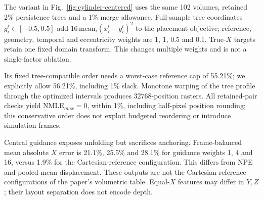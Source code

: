\documentclass[10pt]{article}
\begin{document}
The variant in Fig.~\ref{fig:cylinder-centered} uses the same 102 volumes, retained 2\% persistence trees and a 1\% merge allowance. Full-sample tree coordinates $g_i^t\in[-0.5,0.5]$ add $16\,\mathrm{mean}_i(x_i^t-g_i^t)^2$ to the placement objective; reference, geometry, temporal and eccentricity weights are 1, 1, 0.5 and 0.1. True-$X$ targets retain one fixed domain transform. This changes multiple weights and is not a single-factor ablation.

Its fixed tree-compatible order needs a worst-case reference cap of 55.21\%; we explicitly allow 56.21\%, including 1\% slack. Monotone warping of the tree profile through the optimized intervals produces 32768-position rasters. All retained-pair checks yield NMLE$_{max}=0$, within 1\%, including half-pixel position rounding; this conservative order does not exploit budgeted reordering or introduce simulation frames.

Central guidance exposes unfolding but sacrifices anchoring. Frame-balanced mean absolute $X$ error is 21.1\%, 25.5\% and 28.1\% for guidance weights 1, 4 and 16, versus 1.9\% for the Cartesian-reference configuration. This differs from NPE and pooled mean displacement. These outputs are not the Cartesian-reference configurations of the paper's volumetric table. Equal-$X$ features may differ in $Y,Z$; their layout separation does not encode depth.



\end{document}
